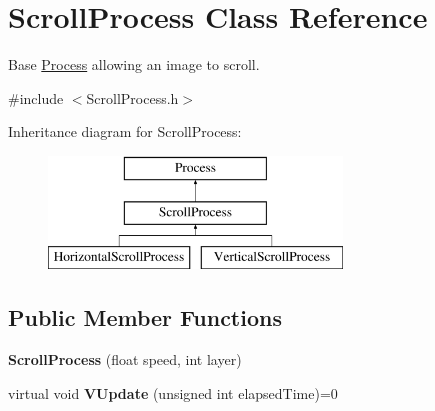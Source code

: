 \hypertarget{classScrollProcess}{\section{Scroll\-Process Class Reference}
\label{classScrollProcess}
}


Base \hyperlink{classProcess}{Process} allowing an image to scroll.  




{\ttfamily \#include $<$Scroll\-Process.\-h$>$}

Inheritance diagram for Scroll\-Process\-:\begin{figure}[H]
\begin{center}
\leavevmode
\includegraphics[height=3.000000cm]{classScrollProcess}
\end{center}
\end{figure}
\subsection*{Public Member Functions}
\begin{DoxyCompactItemize}
\item 
\hypertarget{classScrollProcess_a0ea409a2cc20807e8477777e8d0a0eb2}{{\bfseries Scroll\-Process} (float speed, int layer)}\label{classScrollProcess_a0ea409a2cc20807e8477777e8d0a0eb2}

\item 
\hypertarget{classScrollProcess_a3672ca7be71348c48c43f0562f44cb69}{virtual void {\bfseries V\-Update} (unsigned int elapsed\-Time)=0}\label{classScrollProcess_a3672ca7be71348c48c43f0562f44cb69}

\end{DoxyCompactItemize}
